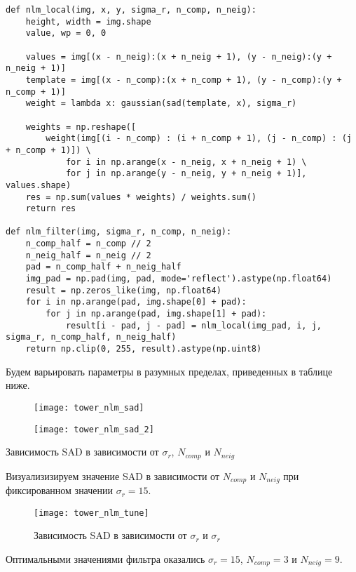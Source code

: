 \begin{lstlisting}[caption={Фунукция для применения билатерального фильтра}]
def nlm_local(img, x, y, sigma_r, n_comp, n_neig):
	height, width = img.shape
	value, wp = 0, 0
	
	values = img[(x - n_neig):(x + n_neig + 1), (y - n_neig):(y + n_neig + 1)]
	template = img[(x - n_comp):(x + n_comp + 1), (y - n_comp):(y + n_comp + 1)]
	weight = lambda x: gaussian(sad(template, x), sigma_r)
	
	weights = np.reshape([
		weight(img[(i - n_comp) : (i + n_comp + 1), (j - n_comp) : (j + n_comp + 1)]) \
			for i in np.arange(x - n_neig, x + n_neig + 1) \
			for j in np.arange(y - n_neig, y + n_neig + 1)], values.shape)
	res = np.sum(values * weights) / weights.sum()
	return res
	
def nlm_filter(img, sigma_r, n_comp, n_neig):
	n_comp_half = n_comp // 2
	n_neig_half = n_neig // 2
	pad = n_comp_half + n_neig_half
	img_pad = np.pad(img, pad, mode='reflect').astype(np.float64)
	result = np.zeros_like(img, np.float64)
	for i in np.arange(pad, img.shape[0] + pad):
		for j in np.arange(pad, img.shape[1] + pad):
			result[i - pad, j - pad] = nlm_local(img_pad, i, j, sigma_r, n_comp_half, n_neig_half)
	return np.clip(0, 255, result).astype(np.uint8)
\end{lstlisting}

Будем варьировать параметры в разумных пределах, приведенных в таблице ниже.

\begin{table}[H]
	\centering
	\begin{subfigure}{0.48\linewidth}
		\texttt{[image: tower\_nlm\_sad]}
	\end{subfigure}
	\begin{subfigure}{0.48\linewidth}
		\texttt{[image: tower\_nlm\_sad\_2]}
	\end{subfigure}
	\caption{Зависимость SAD в зависимости от $\sigma_r$, $ N_{comp}$ и $N_{neig}$}
\end{table}

Визуализизируем значение SAD в зависимости от $N_{comp}$ и $N_{neig}$ при фиксированном значении $\sigma_r = 15$.

\begin{figure}[H]
	\centering
	\texttt{[image: tower\_nlm\_tune]}
	\caption{Зависимость SAD в зависимости от $\sigma_r$ и $\sigma_r$}
\end{figure}

Оптимальными значениями фильтра оказались $\sigma_r = 15$, $N_{comp} = 3$ и $N_{neig} = 9$.

